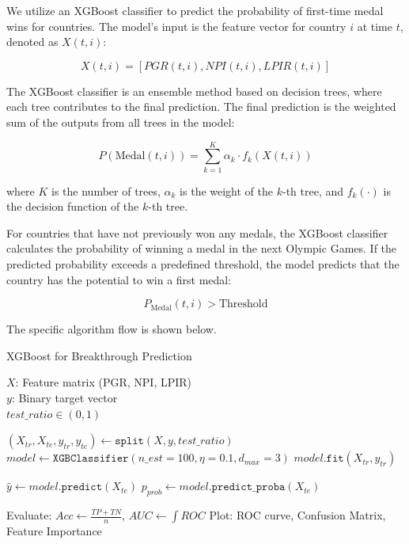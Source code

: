 \documentclass{mcmthesis}
\begin{document}
We utilize an XGBoost classifier to predict the probability of first-time medal wins for countries. The model’s input is the feature vector for country \( i \) at time \( t \), denoted as \( X(t,i) \):

\[
X(t,i) = [PGR(t,i), NPI(t,i), LPIR(t,i)]
\]

The XGBoost classifier is an ensemble method based on decision trees, where each tree contributes to the final prediction. The final prediction is the weighted sum of the outputs from all trees in the model:

\[
P(\text{Medal}(t,i)) = \sum_{k=1}^{K} \alpha_k \cdot f_k(X(t,i))
\]

where \( K \) is the number of trees, \( \alpha_k \) is the weight of the \( k \)-th tree, and \( f_k(\cdot) \) is the decision function of the \( k \)-th tree.


For countries that have not previously won any medals, the XGBoost classifier calculates the probability of winning a medal in the next Olympic Games. If the predicted probability exceeds a predefined threshold, the model predicts that the country has the potential to win a first medal:

\[
P_{\text{Medal}}(t,i) > \text{Threshold}
\]

The specific algorithm flow is shown below.
\begin{algorithm}[H]
	\caption{XGBoost for Breakthrough Prediction}
	\label{alg:xgboost_short}
	\begin{algorithmic}[1]
		\Require 
		$X$: Feature matrix (PGR, NPI, LPIR) \\
		$y$: Binary target vector \\
		$\mathit{test\_ratio} \in (0,1)$
		
		\State $(X_{\mathit{tr}}, X_{\mathit{te}}, y_{\mathit{tr}}, y_{\mathit{te}}) \gets \texttt{split}(X, y, \mathit{test\_ratio})$
		\State $\mathit{model} \gets \texttt{XGBClassifier}(n\_est=100, \eta=0.1, d_{max}=3)$
		\State $\mathit{model}.\texttt{fit}(X_{\mathit{tr}}, y_{\mathit{tr}})$
		
		\State $\hat{y} \gets \mathit{model}.\texttt{predict}(X_{\mathit{te}})$
		\State $p_{\mathit{prob}} \gets \mathit{model}.\texttt{predict\_proba}(X_{\mathit{te}})$
		
		\State Evaluate: $\mathit{Acc} \gets \frac{\mathit{TP+TN}}{n}$, $\mathit{AUC} \gets \int \mathit{ROC}$
		\State Plot: ROC curve, Confusion Matrix, Feature Importance
		\EndProcedure
	\end{algorithmic}
\end{algorithm}
\end{document}
